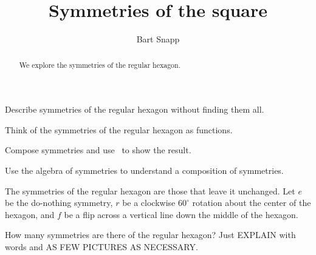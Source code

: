 \documentclass[noauthor,nooutcomes,12pt,hints,handout]{ximera}
\title{Symmetries of the square}
\author{Bart Snapp}
\begin{document}
\begin{abstract}
  We explore the symmetries of the regular hexagon.
\end{abstract}
\maketitle

\begin{listOutcomes}
\item Describe symmetries of the regular hexagon without finding them
  all.
\item Think of the symmetries of the regular hexagon as functions.
\item Compose symmetries and use \snap\ to show the result.
\item Use the algebra of symmetries to understand a composition of
  symmetries.
\end{listOutcomes}
\mynewpage


\begin{question}
  The symmetries of the regular hexagon are those that leave it
  unchanged. Let $e$ be the do-nothing symmetry, $r$ be a clockwise
  $60^\circ$ rotation about the center of the hexagon, and $f$ be a
  flip across a vertical line down the middle of the hexagon.

  
  How many symmetries are there of the regular hexagon? Just
      EXPLAIN with words and AS FEW PICTURES AS NECESSARY.
  
\end{question}
\mynewpage
\end{document}
